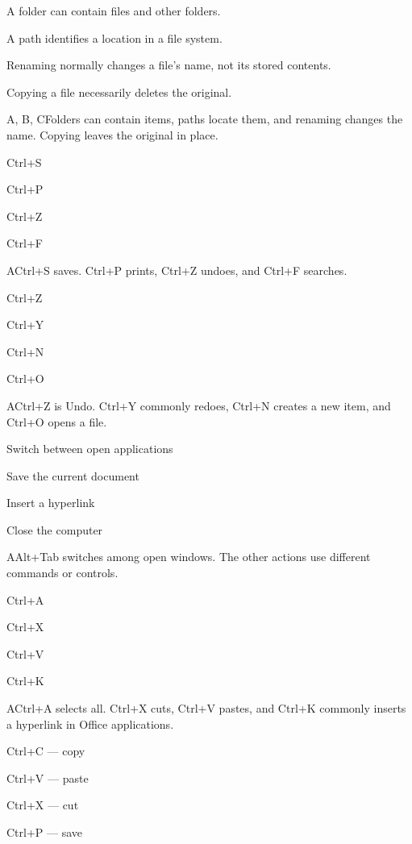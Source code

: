 \begin{enumerate}[label=\textbf{Q\arabic*.}, leftmargin=*]
  {\item A folder can contain files and other folders.
   \item A path identifies a location in a file system.
   \item Renaming normally changes a file's name, not its stored contents.
   \item Copying a file necessarily deletes the original.}
  {A, B, C}{Folders can contain items, paths locate them, and renaming changes the name. Copying leaves the original in place.}
\fi
\ifnum{}
  {\item Ctrl+S
   \item Ctrl+P
   \item Ctrl+Z
   \item Ctrl+F}
  {A}{Ctrl+S saves. Ctrl+P prints, Ctrl+Z undoes, and Ctrl+F searches.}
  {\item Ctrl+Z
   \item Ctrl+Y
   \item Ctrl+N
   \item Ctrl+O}
  {A}{Ctrl+Z is Undo. Ctrl+Y commonly redoes, Ctrl+N creates a new item, and Ctrl+O opens a file.}
  {\item Switch between open applications
   \item Save the current document
   \item Insert a hyperlink
   \item Close the computer}
  {A}{Alt+Tab switches among open windows. The other actions use different commands or controls.}
  {\item Ctrl+A
   \item Ctrl+X
   \item Ctrl+V
   \item Ctrl+K}
  {A}{Ctrl+A selects all. Ctrl+X cuts, Ctrl+V pastes, and Ctrl+K commonly inserts a hyperlink in Office applications.}
  {\item Ctrl+C --- copy
   \item Ctrl+V --- paste
   \item Ctrl+X --- cut
   \item Ctrl+P --- save}

\end{enumerate}
